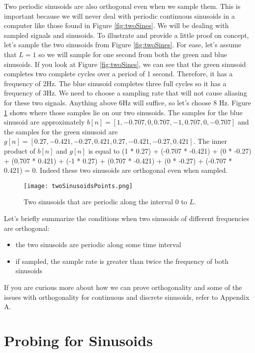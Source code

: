 Two periodic sinusoids are also orthogonal even when we sample them.  This is important because we will
never deal with periodic continuous sinusoids in a computer like those found in Figure \ref{fig:twoSines}.  We will be 
dealing with sampled signals and sinusoids.  To illustrate and provide a little proof on concept, let's sample the
two sinusoids from Figure \ref{fig:twoSines}.  For ease, let's assume that $L = 1$ so we will sample for one second
from both the green and blue sinusoids.  If you look at Figure \ref{fig:twoSines}, we can see that the green sinusoid
completes two complete cycles over a period of 1 second.  Therefore, it has a frequency of 2Hz.  The blue sinusoid
completes three full cycles so it has a frequency of 3Hz.  We need to choose a sampling rate that will not cause aliasing
for these two signals.  Anything above 6Hz will suffice, so let's choose 8 Hz.  Figure \ref{fig:twoSinesPoints} shows 
where those samples lie on our two sinusoids.  The samples for the blue sinusoid are approximately $b[n] = [1, -0.707, 0, 0.707, -1, 0.707, 0, -0.707]$ and the samples for the green
sinusoid are $g[n] = [0.27, -0.421, -0.27, 0.421, 0.27, -0.421, -0.27, 0.421]$.  The inner
product of $b[n]$ and $g[n]$ is equal to (1 * 0.27) + (-0.707 * -0.421) + (0 * -0.27) + 
(0.707 * 0.421) + (-1 * 0.27) + (0.707 * -0.421) + (0 * -0.27) + (-0.707 * 0.421) = 0.
Indeed these two sinusoids are orthogonal even when sampled.

\begin{figure}[h]
	\caption{Two sinusoids that are periodic along the interval 0 to $L$.}
	\centering
	\texttt{[image: twoSinusoidsPoints.png]}
	\label{fig:twoSinesPoints}
\end{figure}

Let's briefly summarize the conditions when two sinusoids of different frequencies
are orthogonal:

\begin{itemize}
	\item the two sinusoids are periodic along some time interval
	\item if sampled, the sample rate is greater than twice the frequency of both sinusoids
\end{itemize}

If you are curious more about how we can prove orthogonality and some of the issues with orthogonality for
continuous and discrete sinusoids, refer to Appendix A.

\section*{Probing for Sinusoids}

